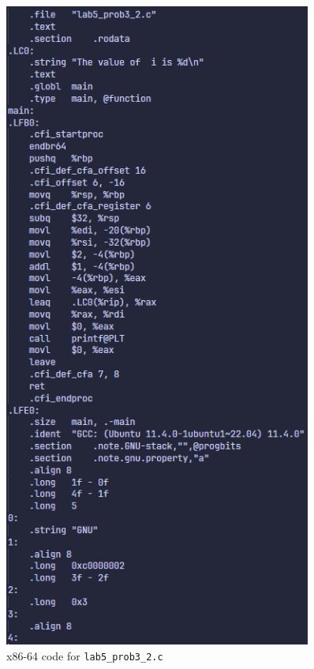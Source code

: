 \documentclass{article}
\begin{document}
\begin{minipage}{0.5\textwidth}
    \begin{figure}[H]
        \centering
        \includegraphics[width=0.9\textwidth]{../images/prob3_code2.png}
        \caption{x86-64 code for \texttt{lab5\_prob3\_2.c}}
    \end{figure}
\end{minipage}
\end{document}

